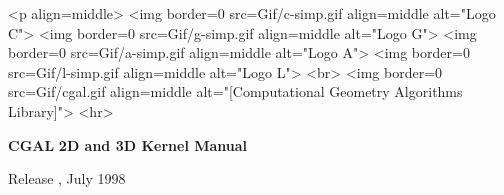 
\pagestyle{empty}

\begin{titlepage}
\mbox{}
\vskip3cm

\ccTexHtml
{\centerline{
    }}
 {<p align=middle>
   <img border=0 src=Gif/c-simp.gif align=middle alt="Logo C">
   <img border=0 src=Gif/g-simp.gif align=middle alt="Logo G">
   <img border=0 src=Gif/a-simp.gif align=middle alt="Logo A">
   <img border=0 src=Gif/l-simp.gif align=middle alt="Logo L">
   <br>
   <img border=0 src=Gif/cgal.gif align=middle
    alt="[Computational Geometry Algorithms Library]">
    <hr>}

\vskip2cm
\centerline{ {\Huge\bf CGAL} {\huge\bf 2D and 3D Kernel Manual } }

\vskip2cm
\newcommand{\mydate}{July 1998}
\ccTexHtml
{\renewcommand{\mydate}{\ifcase\the\month \or January\or
    February\or March\or April\or May\or June\or July\or August\or
    September\or October\or November\or December\fi~\the\year}}{}
  \centerline{ {\large Release \cgalrelease, \mydate} }

\end{titlepage}




